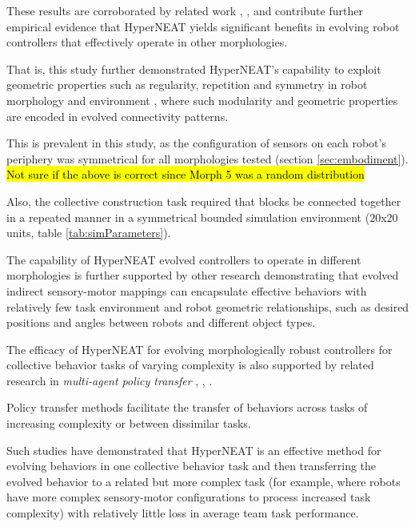 These results are corroborated by related work \cite{RisiStanley2013}, \cite{WatsonNitschke2015SSCI},
and contribute further empirical evidence that HyperNEAT yields significant benefits in
evolving robot controllers that effectively operate in other morphologies.

That is, this study further demonstrated HyperNEAT's capability to exploit geometric properties
such as regularity, repetition and symmetry in robot morphology and environment \cite{StanleyDAmbrosioGauci2009},
where such modularity and geometric properties are encoded in evolved connectivity patterns.

This is prevalent in this study, as the configuration of sensors on each robot's periphery was
symmetrical for all morphologies tested (section \ref{sec:embodiment}).
\hl{Not sure if the above is correct since Morph 5 was a random distribution}


Also, the collective construction task required that blocks be connected together in a repeated manner in a symmetrical bounded
simulation environment ($20$x$20$ units, table \ref{tab:simParameters}).

The capability of HyperNEAT evolved controllers to operate in different morphologies is further
supported by other research \cite{verbancsics_evolving_2010}
demonstrating that evolved indirect sensory-motor mappings can
encapsulate effective behaviors with relatively few task environment and robot
geometric relationships, such as desired positions and angles between robots and different object types.

The efficacy of HyperNEAT for evolving morphologically robust controllers for collective behavior
tasks of varying complexity is also supported by related research in \textit{multi-agent policy transfer}
\cite{verbancsics_evolving_2010}, \cite{DidiNitschke2016SSCI}, \cite{DidiNitschke2016}.

Policy transfer methods facilitate the transfer of behaviors across tasks of increasing
complexity or between dissimilar tasks.  

Such studies have demonstrated that HyperNEAT is an effective
method for evolving behaviors in one collective behavior task and then transferring the evolved behavior
to a related but more complex task (for example, where robots have more complex sensory-motor configurations
to process increased task complexity) with relatively little loss in average team task performance.

